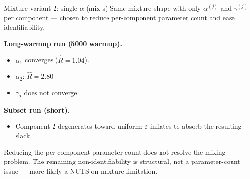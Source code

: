 \documentclass[10pt,aspectratio=169]{beamer}
\newcommand{\main}[1]{\textcolor{CSP-main-dark}{\textbf{#1}}}
\begin{document}
\begin{frame}{Mixture variant 2: single $\alpha$ (mix-s)}
\small
Same mixture shape with only $\alpha^{(j)}$ and $\gamma^{(j)}$ per component --- chosen to reduce per-component parameter count and ease identifiability.

\vspace{0.5em}
\main{Long-warmup run (5000 warmup).}
\begin{itemize}\itemsep0.1em
  \item $\alpha_1$ converges ($\hat R = 1.04$).
  \item $\alpha_2$: $\hat R = 2.80$.
  \item $\gamma_2$ does not converge.
\end{itemize}

\vspace{0.5em}
\main{Subset run (short).}
\begin{itemize}\itemsep0.1em
  \item Component 2 degenerates toward uniform; $\varepsilon$ inflates to absorb the resulting slack.
\end{itemize}

\vspace{0.5em}
Reducing the per-component parameter count does not resolve the mixing problem. The remaining non-identifiability is structural, not a parameter-count issue --- more likely a NUTS-on-mixture limitation.
\end{frame}
\end{document}
